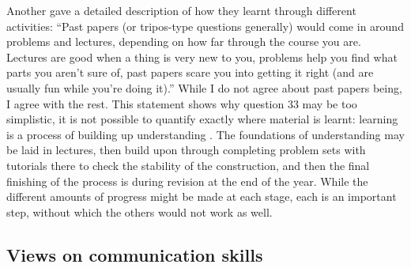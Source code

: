 Another gave a detailed description of how they learnt through different activities: ``Past papers (or tripos-type questions generally) would come in around problems and lectures, depending on how far through the course you are. Lectures are good when a thing is very new to you, problems help you find what parts you aren't sure of, past papers scare you into getting it right (and are usually fun while you're doing it).'' While I do not agree about past papers being, I agree with the rest. This statement shows why question 33 may be too simplistic, it is not possible to quantify exactly where material is learnt: learning is a process of building up understanding \citep[chapter 2]{Kolb1984}. The foundations of understanding may be laid in lectures, then build upon through completing problem sets with tutorials there to check the stability of the construction, and then the final finishing of the process is during revision at the end of the year. While the different amounts of progress might be made at each stage, each is an important step, without which the others would not work as well.

\subsection{Views on communication skills}\label{sec:comm-results}

